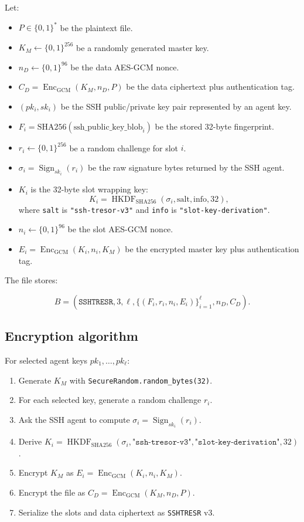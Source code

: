 \documentclass[11pt]{article}
\theoremstyle{definition}
\theoremstyle{plain}
\newcommand{\Tresor}{\texttt{SSHTRESR}}
\newcommand{\HKDF}{\operatorname{HKDF}}
\newcommand{\Enc}{\operatorname{Enc}}
\newcommand{\Sign}{\operatorname{Sign}}
\newcommand{\bitstrings}{\{0,1\}^*}
\begin{document}
Let:

\begin{itemize}[leftmargin=*]
  \item $P \in \bitstrings$ be the plaintext file.
  \item $K_M \leftarrow \{0,1\}^{256}$ be a randomly generated master key.
  \item $n_D \leftarrow \{0,1\}^{96}$ be the data AES-GCM nonce.
  \item $C_D = \Enc_{\mathrm{GCM}}(K_M,n_D,P)$ be the data ciphertext plus authentication tag.
  \item $(pk_i,sk_i)$ be the SSH public/private key pair represented by an agent key.
  \item $F_i = \mathrm{SHA256}(\mathrm{ssh\_public\_key\_blob}_i)$ be the stored 32-byte fingerprint.
  \item $r_i \leftarrow \{0,1\}^{256}$ be a random challenge for slot $i$.
  \item $\sigma_i = \Sign_{sk_i}(r_i)$ be the raw signature bytes returned by the SSH agent.
  \item $K_i$ is the 32-byte slot wrapping key:
  \[
    K_i = \HKDF_{\mathrm{SHA256}}(\sigma_i,\text{salt},\text{info},32),
  \]
  where \texttt{salt} is \texttt{"ssh-tresor-v3"} and \texttt{info} is \texttt{"slot-key-derivation"}.
  \item $n_i \leftarrow \{0,1\}^{96}$ be the slot AES-GCM nonce.
  \item $E_i = \Enc_{\mathrm{GCM}}(K_i,n_i,K_M)$ be the encrypted master key plus authentication tag.
\end{itemize}

The file stores:

\[
  B = \left(\texttt{SSHTRESR}, 3, \ell,
  \{(F_i,r_i,n_i,E_i)\}_{i=1}^{\ell}, n_D, C_D\right).
\]

\subsection{Encryption algorithm}

For selected agent keys $pk_1,\ldots,pk_{\ell}$:

\begin{enumerate}[leftmargin=*]
  \item Generate $K_M$ with \texttt{SecureRandom.random\_bytes(32)}.
  \item For each selected key, generate a random challenge $r_i$.
  \item Ask the SSH agent to compute $\sigma_i=\Sign_{sk_i}(r_i)$.
  \item Derive $K_i=\HKDF_{\mathrm{SHA256}}(\sigma_i,\texttt{"ssh-tresor-v3"},\texttt{"slot-key-derivation"},32)$.
  \item Encrypt $K_M$ as $E_i=\Enc_{\mathrm{GCM}}(K_i,n_i,K_M)$.
  \item Encrypt the file as $C_D=\Enc_{\mathrm{GCM}}(K_M,n_D,P)$.
  \item Serialize the slots and data ciphertext as \Tresor{} v3.
\end{enumerate}
\end{document}
